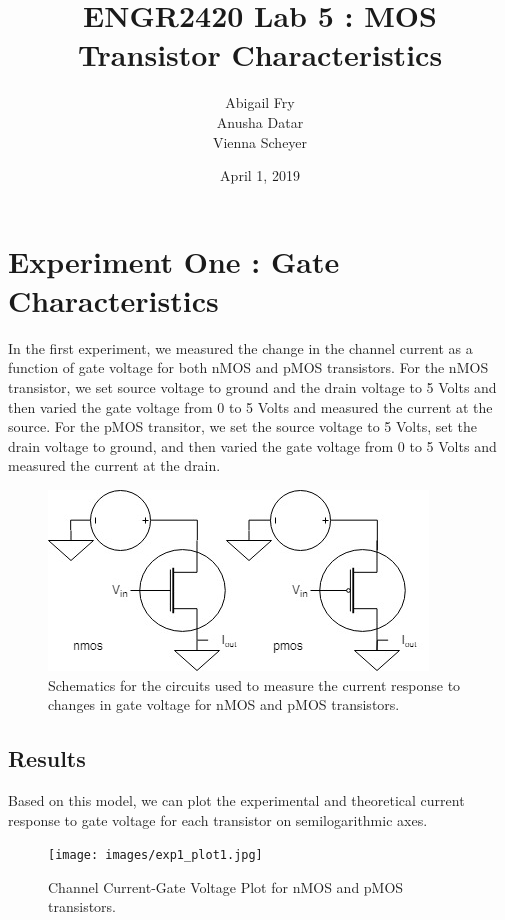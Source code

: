 \documentclass{article}
\title{ENGR2420 Lab 5 : MOS Transistor Characteristics}
\author{Abigail Fry \\ Anusha Datar \\ Vienna Scheyer}
\date{April 1, 2019}
\begin{document}
\maketitle

\section{Experiment One : Gate Characteristics}
In the first experiment, we measured the change in the channel current as a function of gate voltage for both nMOS and pMOS transistors. For the nMOS transistor, we set source voltage to ground and the drain voltage to 5 Volts and then varied the gate voltage from 0 to 5 Volts and measured the current at the source. For the pMOS transitor, we set the source voltage to 5 Volts, set the drain voltage to ground, and then varied the gate voltage from 0 to 5 Volts and measured the current at the drain. 
\begin{figure}[H]   
  \begin{center}       
  \includegraphics[scale = 0.5]{images/exp1_schematic.jpg}
  \caption{Schematics for the circuits used to measure the current response to changes in gate voltage for nMOS and pMOS transistors.}   
  \label{fig:exp1_sch}
  \end{center}
\end{figure}

\subsection{Results}
Based on this model, we can plot the experimental and theoretical current response to gate voltage for each transistor on semilogarithmic axes. 
\begin{figure}[H]   
  \begin{center}      
  \texttt{[image: images/exp1\_plot1.jpg]}
  \caption{Channel Current-Gate Voltage Plot for nMOS and pMOS transistors.}
  \label{fig:exp1_plot1}
  \end{center}
\end{figure}
\end{document}
